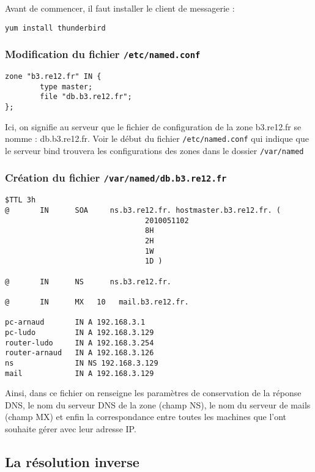 \documentclass[12pt,a4paper,notitlepage]{article}
\begin{document}
Avant de commencer, il faut installer le client de messagerie :
\begin{verbatim}
yum install thunderbird
\end{verbatim}

\bigskip

\subsubsection{Modification du fichier \texttt{/etc/named.conf}}

\begin{lstlisting}[title=Lignes à ajouter]
zone "b3.re12.fr" IN {
        type master;
        file "db.b3.re12.fr";
};
\end{lstlisting}

Ici, on signifie au serveur que le fichier de configuration de la zone b3.re12.fr se nomme : db.b3.re12.fr. Voir le début du fichier \texttt{/etc/named.conf} qui indique que le serveur bind trouvera les configurations des zones dans le dossier \texttt{/var/named}

\subsubsection{Création du fichier \texttt{/var/named/db.b3.re12.fr}}

\begin{lstlisting}[title=Ensemble des paramètres de la zone]
$TTL 3h
@       IN      SOA     ns.b3.re12.fr. hostmaster.b3.re12.fr. (
                                2010051102
                                8H
                                2H
                                1W
                                1D )

@       IN      NS      ns.b3.re12.fr.

@       IN      MX   10   mail.b3.re12.fr.

pc-arnaud       IN A 192.168.3.1
pc-ludo         IN A 192.168.3.129
router-ludo     IN A 192.168.3.254
router-arnaud   IN A 192.168.3.126
ns              IN NS 192.168.3.129
mail            IN A 192.168.3.129
\end{lstlisting}

Ainsi, dans ce fichier on renseigne les paramètres de conservation de la réponse DNS,  le nom du serveur DNS de la zone (champ NS), le nom du serveur de mails (champ MX) et enfin la correspondance entre toutes les machines que l'ont souhaite gérer avec leur adresse IP. 

\clearpage
\subsection{La résolution inverse}
\end{document}
